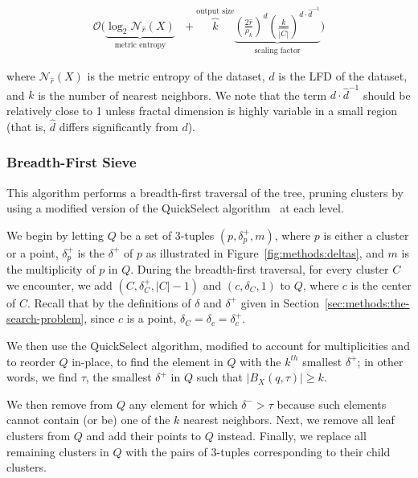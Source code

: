 \begin{gather}
    \mathcal{O}
    \Bigg(
        \underbrace{\log_2{\mathcal{N}_{\hat{r}}(X)}}_{\textrm{metric entropy}} \ \ \ + 
        \overbrace{k}^{\textrm{output size}}
        \underbrace{
            \left( \frac{2\hat{r}}{\rho_k} \right) ^ d \left( \frac{k}{\hat{|C|}} \right) ^ {d \cdot \hat{d}^{-1}}
        }_{\textrm{scaling factor}}
    \Bigg)
    \label{eq:methods:repeated-rnn-complexity}
\end{gather}

where $\mathcal{N}_{\hat{r}}(X)$ is the metric entropy of the dataset, $d$ is the LFD of the dataset, and $k$ is the number of nearest neighbors.
We note that the term $d \cdot \hat{d}^{-1}$ should be relatively close to 1 unless fractal dimension is highly variable in a small region (that is, $\hat{d}$ differs significantly from $d$).


\subsubsection{Breadth-First Sieve}
\label{sec:methods:knn-search:bredth-first-sieve}

This algorithm performs a breadth-first traversal of the tree, pruning clusters by using a modified version of the QuickSelect algorithm~\cite{hoare1961algorithm} at each level.

We begin by letting $Q$ be a set of 3-tuples $(p, \delta^{+}_{p}, m)$, where $p$ is either a cluster or a point, $\delta^{+}_{p}$ is the $\delta^{+}$ of $p$ as illustrated in Figure~\ref{fig:methods:deltas}, and $m$ is the multiplicity of $p$ in $Q$.
During the breadth-first traversal, for every cluster $C$ we encounter, we add $(C, \delta^{+}_{C}, |C| - 1)$ and $(c, \delta_{C}, 1)$ to $Q$, where $c$ is the center of $C$.
Recall that by the definitions of $\delta$ and $\delta^{+}$ given in Section~\ref{sec:methods:the-search-problem}, since $c$ is a point, $\delta_{C} = \delta_{c} = \delta^{+}_{c}$.

We then use the QuickSelect algorithm, modified to account for multiplicities and to reorder $Q$ in-place, to find the element in $Q$ with the $k^{th}$ smallest $\delta^{+}$; in other words, we find $\tau$, the smallest $\delta^{+}$ in $Q$ such that $\left| B_X(q, \tau) \right| \geq k$.

We then remove from $Q$ any element for which $\delta^{-} > \tau$ because such elements cannot contain (or be) one of the $k$ nearest neighbors.
Next, we remove all leaf clusters from $Q$ and add their points to $Q$ instead.
Finally, we replace all remaining clusters in $Q$ with the pairs of 3-tuples corresponding to their child clusters.

